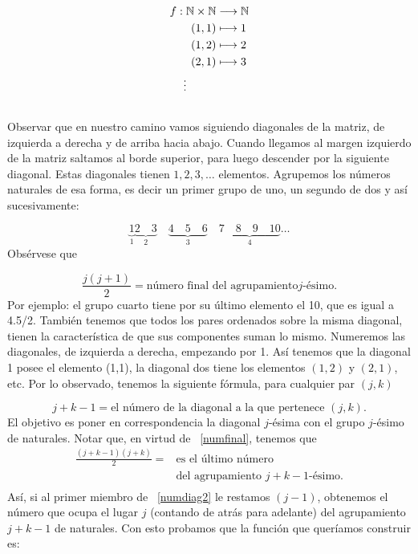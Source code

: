 \begin{demo}
\begin{eqnarray}
    f:\nn\times\nn&\longrightarrow\nn\nonumber \\
    (1,1)&\longmapsto 1\nonumber \\
    (1,2)&\longmapsto 2\nonumber \\
     (2,1)&\longmapsto 3\nonumber\\
        &\hspace{-29pt}\vdots\nonumber \\
        \nonumber
\end{eqnarray}
Observar que en nuestro camino vamos siguiendo diagonales de
la matriz, de izquierda a derecha y de arriba hacia abajo. Cuando llegamos al margen izquierdo de la matriz
saltamos al borde superior, para luego descender por la
siguiente diagonal. Estas diagonales tienen $1, 2, 3, \dots$
elementos. Agrupemos los números naturales de esa forma, es
decir un primer grupo de uno, un segundo de dos y así
sucesivamente:

\[\underbrace{1}_{1} \underbrace{2\quad 3}_{2}\quad\underbrace{4\quad 5\quad
6}_{3}\quad \underbrace{7\quad 8\quad  9\quad 10}_{4}\dots
\]
Obsérvese que

\begin{equation}\label{numfinal}
\frac{j(j +1)}{2}=\text{número final del agrupamiento
$j$-ésimo}.
\end{equation}
Por ejemplo: el grupo cuarto tiene por su último elemento el 10,
que es igual a 4.5/2. También tenemos que todos los pares
ordenados sobre la misma diagonal, tienen la característica
de que sus componentes suman lo mismo. Numeremos las diagonales,
de izquierda a derecha, empezando por 1. Así tenemos que la
diagonal 1 posee el elemento (1,1), la diagonal dos tiene los
elementos $(1,2)$ y $(2,1)$, etc. Por lo observado, tenemos la
siguiente fórmula, para cualquier par $(j,k)$

\begin{equation}\label{numdiag}
j+k-1=\text{el número de la diagonal a la que pertenece } (j,k).
\end{equation}
 El objetivo es poner en correspondencia la diagonal
$j$-ésima con el grupo $j$-ésimo de naturales. Notar que, en
virtud de ~\eqref{numfinal}, tenemos que
\begin{equation}\label{numdiag2}
\begin{split}
\frac{(j+k-1)(j+k)}{2}=&\text{es el último número}\\
                       &\text{del agrupamiento $j+k-1$-ésimo}.\\
\end{split}
\end{equation}
Así, si al primer miembro de ~\eqref{numdiag2} le restamos
$(j-1)$, obtenemos el número que ocupa el lugar $j$ (contando de
atrás para adelante) del agrupamiento $j+k-1$ de naturales. Con
esto probamos que la función que queríamos construir es:


\end{demo}
